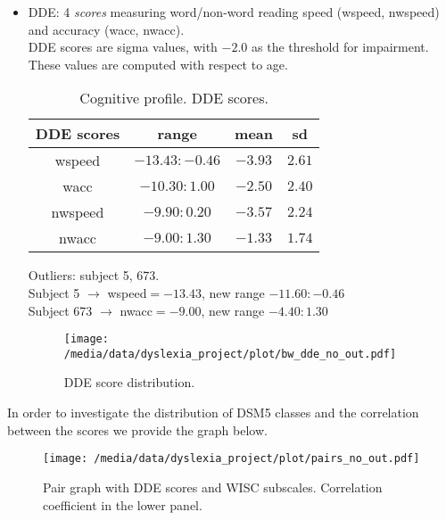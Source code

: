 \documentclass[11pt, a4paper, twoside, openright]{article}
\begin{document}
\begin{itemize}
\item DDE: 4 \emph{scores} measuring word/non-word reading speed
  (wspeed, nwspeed) and accuracy (wacc, nwacc).\\
  DDE scores are sigma values, with $-2.0$ as the threshold for
  impairment. These values are computed with respect to age.
\begin{table}[h!]
\begin{center}
  \begin{tabular}{|c|c|c|c|}
    \hline
    DDE scores & range & mean & sd\\
    \hline \hline
    wspeed & $-13.43:-0.46$ & $-3.93$ & $2.61$\\
    \hline
    wacc & $-10.30:1.00$ & $-2.50$ & $2.40$\\
    \hline
    nwspeed & $-9.90:0.20$ & $-3.57$ & $2.24$\\
    \hline
    nwacc & $-9.00:1.30$ & $-1.33$ & $1.74$\\
    \hline
  \end{tabular}
\end{center}
\caption{Cognitive profile. DDE scores.}
\label{tab:3}
\end{table}

Outliers: subject 5, 673.\\
Subject 5 $\longrightarrow$ wspeed$=-13.43$, new range $-11.60:-0.46$\\
Subject 673 $\longrightarrow$ nwacc$=-9.00$, new range $-4.40:1.30$

\begin{figure}[h!] 
\centering
\texttt{[image: /media/data/dyslexia\_project/plot/bw\_dde\_no\_out.pdf]}
\caption{DDE score distribution.}
\label{fig:4}
\end{figure}


\end{itemize}

\clearpage

In order to investigate the distribution of DSM5 classes and the
correlation between the scores we provide the graph below.
\begin{figure}[h!] 
\centering
\texttt{[image: /media/data/dyslexia\_project/plot/pairs\_no\_out.pdf]}
\caption{Pair graph with DDE scores and WISC subscales. Correlation coefficient in the lower panel.}
\label{fig:6}
\end{figure}
\end{document}
